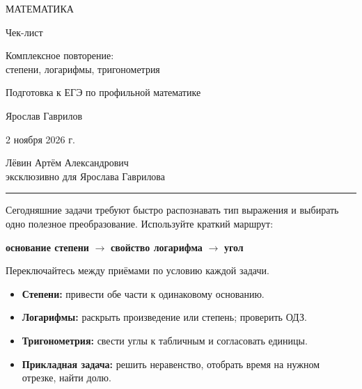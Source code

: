 \documentclass[a4paper,12pt]{article}
\newcommand{\sect}[2]{%
  \Needspace{7\baselineskip}%
  \vspace{6pt}\noindent{\large\textcolor{darkaccent}{#1.\enspace #2}}\par\vspace{-1pt}%
  {\color{accent}\rule{\linewidth}{0.45pt}}\par\vspace{5pt}}
\begin{document}
\thispagestyle{empty}
\begin{center}
\vspace*{25mm}
{\normalsize\textcolor{darkaccent}{МАТЕМАТИКА}}\par
\vspace{24mm}
{\LARGE Чек-лист}\par
\vspace{10mm}
{\Large\textcolor{accent}{Комплексное повторение:\\[3pt] степени, логарифмы, тригонометрия}}\par
\vspace{20mm}
{\normalsize Подготовка к ЕГЭ по профильной математике}\par
\vfill
{\large Ярослав Гаврилов}\par
\vspace{12mm}
{\normalsize 2 ноября 2026 г.}\par
\vspace{17mm}
{\small Лёвин Артём Александрович\\[3pt] эксклюзивно для Ярослава Гаврилова}\par
\vspace{18mm}
\vspace{7mm}
\end{center}
\clearpage

\sect{1}{Маршрут комплексного повторения}
Сегодняшние задачи требуют быстро распознавать тип выражения и выбирать одно полезное преобразование. Используйте краткий маршрут:
\begin{center}
\textcolor{darkaccent}{\textbf{основание степени}}
\quad$\longrightarrow$\quad
\textcolor{darkaccent}{\textbf{свойство логарифма}}
\quad$\longrightarrow$\quad
\textcolor{darkaccent}{\textbf{угол}}\par
\vspace{1pt}
\small Переключайтесь между приёмами по условию каждой задачи.
\end{center}
\begin{itemize}
\item \textbf{Степени:} привести обе части к одинаковому основанию.
\item \textbf{Логарифмы:} раскрыть произведение или степень; проверить ОДЗ.
\item \textbf{Тригонометрия:} свести углы к табличным и согласовать единицы.
\item \textbf{Прикладная задача:} решить неравенство, отобрать время на нужном отрезке, найти долю.
\end{itemize}
\end{document}
